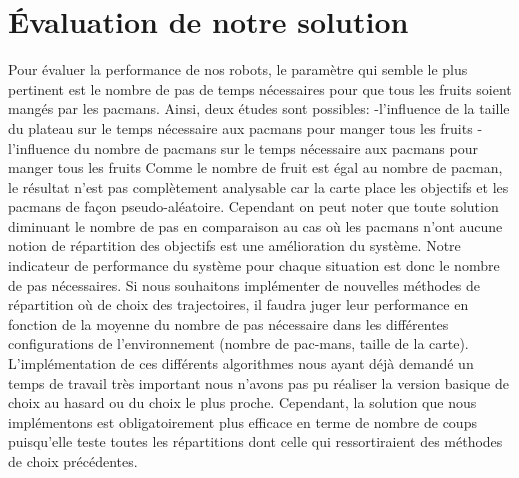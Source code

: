 \section{Évaluation de notre solution}
Pour évaluer la performance de nos robots, le paramètre qui semble le plus pertinent est le nombre de pas de temps nécessaires pour que tous les fruits soient mangés par les pacmans.
Ainsi, deux études sont possibles:
-l’influence de la taille du plateau sur le temps nécessaire aux pacmans pour manger tous les fruits
-l’influence du nombre de pacmans sur le temps nécessaire aux pacmans pour manger tous les fruits
Comme le nombre de fruit est égal au nombre de pacman, le résultat n'est pas complètement analysable car la carte place les objectifs et les pacmans de façon pseudo-aléatoire. Cependant on peut noter que toute solution diminuant le nombre de pas en comparaison au cas où les pacmans n'ont aucune notion de répartition des objectifs est une amélioration du système. Notre indicateur de performance du système pour chaque situation est donc le nombre de pas nécessaires. Si nous souhaitons implémenter de nouvelles méthodes de répartition où de choix des trajectoires, il faudra juger leur performance en fonction de la moyenne du nombre de pas nécessaire dans les différentes configurations de l'environnement (nombre de pac-mans, taille de la carte). L'implémentation de ces différents algorithmes nous ayant déjà demandé un temps de travail très important nous n'avons pas pu réaliser la version basique de choix au hasard ou du choix le plus proche. Cependant, la solution que nous implémentons est obligatoirement plus efficace en terme de nombre de coups puisqu'elle teste toutes les répartitions dont celle qui ressortiraient des méthodes de choix précédentes.

